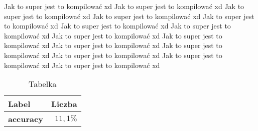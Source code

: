 \documentclass[12pt]{pwrdpl}
\author{Bartosz Błyszcz}
\date{2024}
\begin{document}
	\titlepages
	\RedefinePlainStyle
	
	\setcounter{tocdepth}{2}
	\tableofcontents
	\clearpage
	
	\sloppy
	\setnowidow
	
	Jak to super jest to kompilować xd Jak to super jest to kompilować xd Jak to super jest to kompilować xd Jak to super jest to kompilować xd Jak to super jest to kompilować xd Jak to super jest to kompilować xd Jak to super jest to kompilować xd Jak to super jest to kompilować xd Jak to super jest to kompilować xd Jak to super jest to kompilować xd Jak to super jest to kompilować xd Jak to super jest to kompilować xd Jak to super jest to kompilować xd Jak to super jest to kompilować xd
	\begin{table}[H]
		\centering
		\caption{Tabelka}
		\begin{tabular}{|l|r|} \hline
			\textbf{Label} & \textbf{Liczba} \\ \hline
			\textbf{accuracy} & $11,1\%$ \\ \hline
		\end{tabular}
	\end{table}


	\renewcommand*{\listfigurename}{Wykaz rysunków}
	\renewcommand*{\listtablename}{Wykaz tabel}
	\listoffigures
	\clearpage
	\listoftables

	\printbibliography
\end{document}

